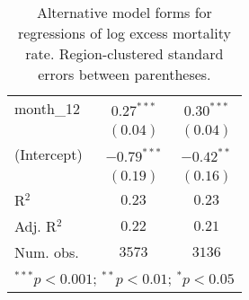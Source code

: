 \begin{table}[h!]
\begin{center}
\begin{small}
\begin{tabular}{l c c}
month\_12      & $0.27^{***}$  & $0.30^{***}$  \\
               & $(0.04)$      & $(0.04)$      \\
(Intercept)    & $-0.79^{***}$ & $-0.42^{**}$  \\
               & $(0.19)$      & $(0.16)$      \\
\hline
R$^2$          & $0.23$        & $0.23$        \\
Adj. R$^2$     & $0.22$        & $0.21$        \\
Num. obs.      & $3573$        & $3136$        \\
\hline
\multicolumn{3}{l}{\tiny{$^{***}p<0.001$; $^{**}p<0.01$; $^{*}p<0.05$}}
\end{tabular}
\end{small}
\caption{Alternative model forms for regressions of log excess mortality rate. Region-clustered standard errors between parentheses.}
\label{tab:altmodels}
\end{center}
\end{table}
